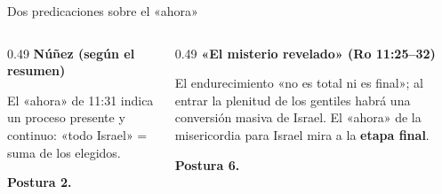 \begin{frame}{Dos predicaciones sobre el «ahora»}
\begin{columns}[T,onlytextwidth]
\begin{column}{0.49\textwidth}\scriptsize\RaggedRight
\textbf{\textcolor{ladrillo}{Núñez (según el resumen)}}\par\smallskip
El «ahora» de 11:31 indica un proceso presente y continuo: «todo Israel» = suma de los elegidos.\par\smallskip
\textbf{Postura 2.}
\end{column}
\begin{column}{0.49\textwidth}\scriptsize\RaggedRight
\textbf{\textcolor{ladrillo}{«El misterio revelado» (Ro 11:25--32)}}\par\smallskip
El endurecimiento «no es total ni es final»; al entrar la plenitud de los gentiles habrá una conversión masiva de Israel. El «ahora» de la misericordia para Israel mira a la \textbf{etapa final}.\par\smallskip
\textbf{Postura 6.}
\end{column}
\end{columns}\par\medskip
\centering
{}\elabpropia
\end{frame}

